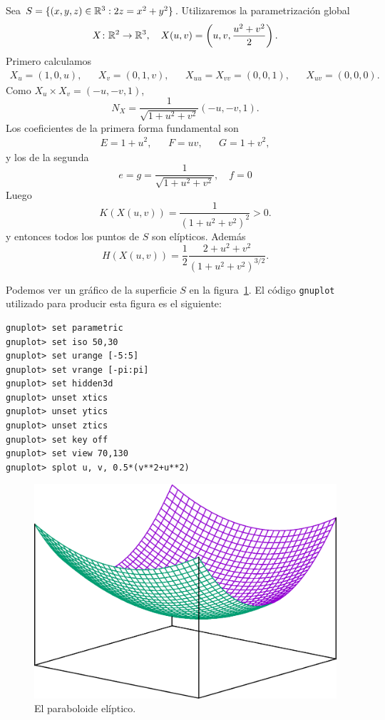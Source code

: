 \begin{example}
	Sea $S=\{(x,y,z)\in\mathbb{R}^3:2z=x^2+y^2\}$. Utilizaremos la parametrización global 
	\[
		X\colon\mathbb{R}^2\to\mathbb{R}^3,\quad
		X(u,v)=\left(u,v,\frac{u^2+v^2}{2}\right).
	\]
	Primero calculamos
	\begin{align*}
		X_u = (1,0,u), && X_v=(0,1,v), && X_{uu}=X_{vv}=(0,0,1), && X_{uv}=(0,0,0).
	\end{align*}
	Como $X_u\times X_v=(-u,-v,1)$, 
	\[
		N_X=\frac{1}{\sqrt{1+u^2+v^2}}(-u,-v,1).
	\]
	Los coeficientes de la primera forma fundamental son 
	\begin{align*}
		E=1+u^2, && F=uv, && G=1+v^2, 
	\end{align*}
	y los de la segunda
	\[
		e=g=\frac{1}{\sqrt{1+u^2+v^2}},\quad
		f=0
	\]
	Luego 
	\[
		K(X(u,v))=\frac{1}{(1+u^2+v^2)^2}>0.
	\]
	y entonces todos los puntos de $S$ son elípticos.  Además 
	\[
		H(X(u,v))=\frac12\frac{2+u^2+v^2}{(1+u^2+v^2)^{3/2}}.
	\]

	Podemos ver un gráfico de la superficie $S$ en 
	la figura~\ref{fig:eliptico}. 
	El código \lstinline{gnuplot} utilizado para producir esta figura es el siguiente:
\begin{lstlisting}
gnuplot> set parametric
gnuplot> set iso 50,30
gnuplot> set urange [-5:5]
gnuplot> set vrange [-pi:pi]
gnuplot> set hidden3d
gnuplot> unset xtics
gnuplot> unset ytics
gnuplot> unset ztics
gnuplot> set key off
gnuplot> set view 70,130
gnuplot> splot u, v, 0.5*(v**2+u**2)
\end{lstlisting}
\begin{figure}
		\centering
    	\includegraphics[scale=0.3]{eps/eliptico}
		\caption{El paraboloide elíptico.}
		\label{fig:eliptico}
\end{figure}
\end{example}

